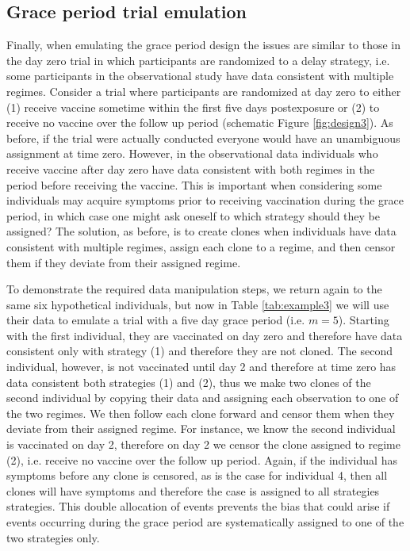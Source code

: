 \begin{appendices}
\begin{refsection}
    \subsection{Grace period trial emulation}\label{sec:graceperiod_emulation}

    Finally, when emulating the grace period design the issues are similar to those in the day zero trial in which participants are randomized to a delay strategy, i.e. some participants in the observational study have data consistent with multiple regimes. Consider a trial where participants are randomized at day zero to either (1) receive vaccine sometime within the first five days postexposure or (2) to receive no vaccine over the follow up period (schematic Figure \ref{fig:design3}). As before, if the trial were actually conducted everyone would have an unambiguous assignment at time zero. However, in the observational data individuals who receive vaccine after day zero have data consistent with both regimes in the period before receiving the vaccine. This is important when considering some individuals may acquire symptoms prior to receiving vaccination during the grace period, in which case one might ask oneself to which strategy should they be assigned? The solution, as before, is to create clones when individuals have data consistent with multiple regimes, assign each clone to a regime, and then censor them if they deviate from their assigned regime. 

    To demonstrate the required data manipulation steps, we return again to the same six hypothetical individuals, but now in Table \ref{tab:example3} we will use their data to emulate a trial with a five day grace period (i.e. $m = 5$). Starting with the first individual, they are vaccinated on day zero and therefore have data consistent only with strategy (1) and therefore they are not cloned. The second individual, however, is not vaccinated until day 2 and therefore at time zero has data consistent both strategies (1) and (2), thus we make two clones of the second individual by copying their data and assigning each observation to one of the two regimes. We then follow each clone forward and censor them when they deviate from their assigned regime. For instance, we know the second individual is vaccinated on day 2, therefore on day 2 we censor the clone assigned to regime (2), i.e. receive no vaccine over the follow up period. Again, if the individual has symptoms before any clone is censored, as is the case for individual 4, then all clones will have symptoms and therefore the case is assigned to all strategies strategies. This double allocation of events prevents the bias that could arise if events occurring during the grace period are systematically assigned to one of the two strategies only. 


\end{refsection}
\end{appendices}
